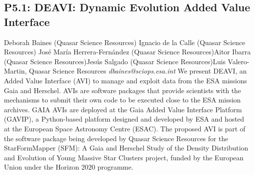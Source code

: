 \documentclass{report}
\begin{document}
\subsection*{P5.1: DEAVI: Dynamic Evolution Added Value Interface}
\bigskip
Deborah Baines (Quasar Science Resources) \newline Ignacio de la Calle (Quasar Science Resources) \newline  José María Herrera-Fernández (Quasar Science Resources)\newline  Aitor Ibarra (Quasar Science Resources)\newline Jesús Salgado (Quasar Science Resources)\newline  Luis Valero-Martin, Quasar Science Resources\newline\newline
{\it dbaines@sciops.esa.int}\newline
\newline\newline
We present DEAVI, an Added Value Interface (AVI) to manage and exploit data from the ESA missions Gaia and Herschel. AVIs are software packages that provide scientists with the mechanisms to submit their own code to be executed close to the ESA mission archives. GAIA AVIs are deployed at the Gaia Added Value Interface Platform (GAVIP), a Python-based platform designed and developed by ESA and hosted at the European Space Astronomy Centre (ESAC). The proposed AVI is part of the software package being developed by Quasar Science Resources for the StarFormMapper (SFM): A Gaia and Herschel Study of the Density Distribution and Evolution of Young Massive Star Clusters project, funded by the European Union under the Horizon 2020 programme.\newline
\newpage
\end{document}
